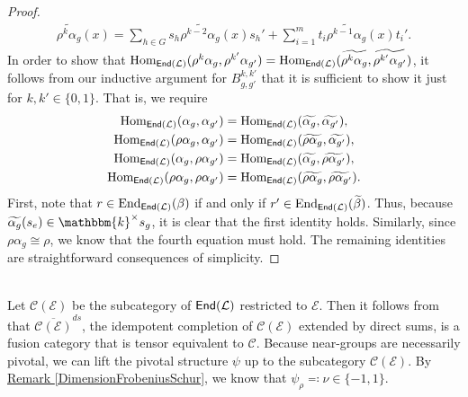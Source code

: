 \begin{proof}
\begin{align*}
\widetilde{\rho^k\alpha_g}(x) = \sum_{h \in G}s_h\widetilde{\rho^{k-2}\alpha_g}(x)s_h' + \sum_{i=1}^m t_i\widetilde{\rho^{k-1}\alpha_g}(x)t_i'.
\end{align*}
\noindent In order to show that $\textup{Hom}_{\textup{\textsf{End}}(\mathcal{L})}(\rho^k\alpha_g, \rho^{k'}\alpha_{g'}) = \textup{Hom}_{\textup{\textsf{End}}(\mathcal{L})}(\widetilde{\rho^k\alpha_g}, \widetilde{\rho^{k'}\alpha_{g'}})$, it follows from our inductive argument for $B^{k,k'}_{g,g'}$ that it is sufficient to show it just for $k, k' \in \{0, 1\}$. That is, we require
\begin{align*}
\homset_{\textcat{End}(\mathcal{L})}(\alpha_g, \alpha_{g'}) &= \homset_{\textcat{End}(\mathcal{L})}(\widetilde{\alpha_g}, \widetilde{\alpha_{g'}}),\\%
\homset_{\textcat{End}(\mathcal{L})}(\rho\alpha_g, \alpha_{g'}) &= \homset_{\textcat{End}(\mathcal{L})}(\widetilde{\rho\alpha_g}, \widetilde{\alpha_{g'}}),\\
\homset_{\textcat{End}(\mathcal{L})}(\alpha_g, \rho\alpha_{g'}) &= \homset_{\textcat{End}(\mathcal{L})}(\widetilde{\alpha_g}, \widetilde{\rho\alpha_{g'}}),\\
\homset_{\textcat{End}(\mathcal{L})}(\rho\alpha_g, \rho\alpha_{g'}) &= \homset_{\textcat{End}(\mathcal{L})}(\widetilde{\rho\alpha_g}, \widetilde{\rho\alpha_{g'}}).%
\end{align*}
\noindent First, note that $r \in \textup{End}_{\textup{\textsf{End}}(\mathcal{L})}(\beta)$ if and only if $r' \in \textup{End}_{\textup{\textsf{End}}(\mathcal{L})}(\widetilde{\beta})$. Thus, because $\widetilde{\alpha_g}(s_e) \in \mathbbm{k}^\times s_g$, it is clear that the first identity holds. Similarly, since $\rho\alpha_g \cong \rho$, we know that the fourth equation must hold. The remaining identities are straightforward consequences of simplicity.
\end{proof}\\

\noindent Let $\mathcal{C}(\mathcal{E})$ be the subcategory of $\textup{\textsf{End}}(\mathcal{L})$ restricted to $\mathcal{E}$. Then it follows from \cite[Lemma 2]{EG17} that $\overline{\mathcal{C}(\mathcal{E})}^{ds}$, the idempotent completion of $\mathcal{C}(\mathcal{E})$ extended by direct sums, is a fusion category that is tensor equivalent to $\mathcal{C}$. Because near-groups are necessarily pivotal, we can lift the pivotal structure $\psi$ up to the subcategory $\mathcal{C}(\mathcal{E})$. By \hyperref[DimensionFrobeniusSchur]{Remark \ref*{DimensionFrobeniusSchur}}, we know that $\psi_\rho \eqcolon \nu \in \{-1, 1\}$.\\

